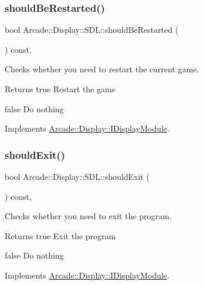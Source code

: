 \subsubsection{\texorpdfstring{shouldBeRestarted()}{shouldBeRestarted()}}
{\footnotesize\ttfamily bool Arcade\+::\+Display\+::\+S\+D\+L\+::should\+Be\+Restarted (\begin{DoxyParamCaption}{ }\end{DoxyParamCaption}) const\hspace{0.3cm}{\ttfamily [final]}, {\ttfamily [virtual]}}



Checks whether you need to restart the current game. 

\begin{DoxyReturn}{Returns}
true Restart the game 

false Do nothing 
\end{DoxyReturn}


Implements \mbox{\hyperlink{classArcade_1_1Display_1_1IDisplayModule_adc5d499229aa5899bbd4bae14f00cb27}{Arcade\+::\+Display\+::\+I\+Display\+Module}}.

\mbox{\label{classArcade_1_1Display_1_1SDL_adb5d8837174b0ca120a27a521320f9c0}} 
\subsubsection{\texorpdfstring{shouldExit()}{shouldExit()}}
{\footnotesize\ttfamily bool Arcade\+::\+Display\+::\+S\+D\+L\+::should\+Exit (\begin{DoxyParamCaption}{ }\end{DoxyParamCaption}) const\hspace{0.3cm}{\ttfamily [final]}, {\ttfamily [virtual]}}



Checks whether you need to exit the program. 

\begin{DoxyReturn}{Returns}
true Exit the program 

false Do nothing 
\end{DoxyReturn}


Implements \mbox{\hyperlink{classArcade_1_1Display_1_1IDisplayModule_a550877fb92d58325404b9ebe9e71f6ff}{Arcade\+::\+Display\+::\+I\+Display\+Module}}.

